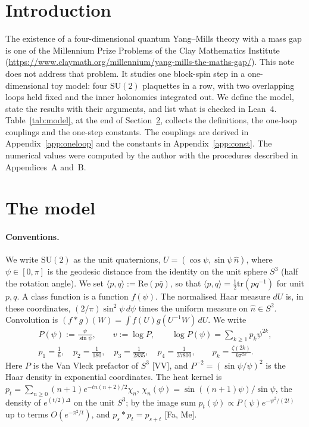 \documentclass[11pt,a4paper]{article}
\theoremstyle{definition}
\theoremstyle{remark}
\newcommand{\SU}{\mathrm{SU}(2)}
\begin{document}
\section{Introduction}\label{sec:intro}

The existence of a four-dimensional quantum Yang--Mills theory with a mass gap is one of the Millennium Prize Problems of the Clay Mathematics Institute (\url{https://www.claymath.org/millennium/yang-mills-the-maths-gap/}).
This note does not address that problem.
It studies one block-spin step in a one-dimensional toy model: four $\SU$ plaquettes in a row, with two overlapping loops held fixed and the inner holonomies integrated out.
We define the model, state the results with their arguments, and list what is checked in Lean~4.
Table~\ref{tab:model}, at the end of Section~\ref{sec:model}, collects the definitions, the one-loop couplings and the one-step constants.
The couplings are derived in Appendix~\ref{app:oneloop} and the constants in Appendix~\ref{app:const}.
The numerical values were computed by the author with the procedures described in Appendices~A and~B.

\section{The model}\label{sec:model}

\paragraph{Conventions.}
We write $\SU$ as the unit quaternions, $U=(\cos\psi,\sin\psi\,\hat n)$, where $\psi\in[0,\pi]$ is the geodesic distance from the identity on the unit sphere $S^3$ (half the rotation angle).
We set $\langle p,q\rangle:=\mathrm{Re}(p\bar q)$, so that $\langle p,q\rangle=\tfrac12\mathrm{tr}(pq^{-1})$ for unit $p,q$.
A class function is a function $f(\psi)$.
The normalised Haar measure $dU$ is, in these coordinates, $(2/\pi)\sin^2\psi\,d\psi$ times the uniform measure on $\hat n\in S^2$.
Convolution is $(f*g)(W)=\int f(U)g(U^{-1}W)\,dU$.
We write
\begin{gather*}
P(\psi):=\frac{\psi}{\sin\psi},\qquad v:=\log P,\qquad \log P(\psi)=\sum_{k\ge1}p_k\psi^{2k},\\
p_1=\tfrac16,\quad p_2=\tfrac1{180},\quad p_3=\tfrac1{2835},\quad p_4=\tfrac1{37800},\qquad p_k=\frac{\zeta(2k)}{k\pi^{2k}}.
\end{gather*}
Here $P$ is the Van Vleck prefactor of $S^3$ [VV], and $P^{-2}=(\sin\psi/\psi)^2$ is the Haar density in exponential coordinates.
The heat kernel is $p_t=\sum_{n\ge0}(n+1)e^{-tn(n+2)/2}\chi_n$, $\chi_n(\psi)=\sin((n+1)\psi)/\sin\psi$, the density of $e^{(t/2)\Delta}$ on the unit $S^3$; by the image sum $p_t(\psi)\propto P(\psi)e^{-\psi^2/(2t)}$ up to terms $O(e^{-\pi^2/t})$, and $p_s*p_t=p_{s+t}$ [Fa, Me].
\end{document}
